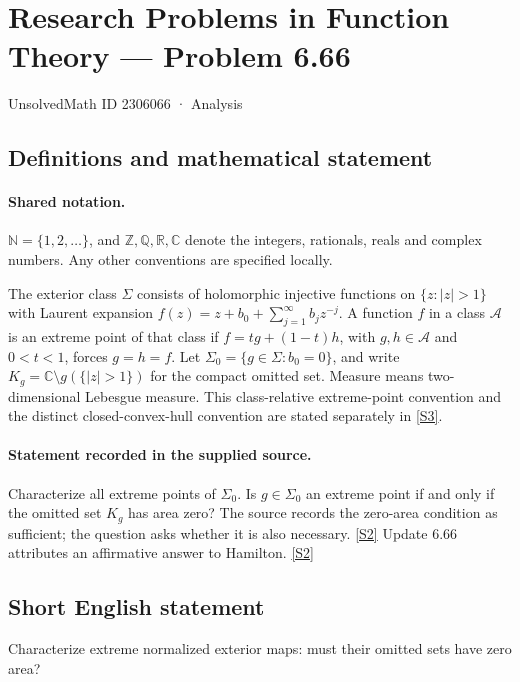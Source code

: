 \documentclass[11pt]{article}
\newcommand{\sref}[2]{\hyperlink{source:#1:#2}{[S#2]}}
\begin{document}
\setcounter{section}{2306065}
\section{Research Problems in Function Theory — Problem 6.66}\label{2306066}
{\small\sffamily UnsolvedMath ID 2306066 · Analysis}
\subsection{Definitions and mathematical statement}

\paragraph{Shared notation.}$\mathbb N=\{1,2,\ldots\}$, and $\mathbb Z,\mathbb Q,\mathbb R,\mathbb C$ denote the integers, rationals, reals and complex numbers. Any other conventions are specified locally.


The exterior class $\Sigma$ consists of holomorphic injective functions on $\{z:|z|>1\}$ with Laurent expansion $f(z)=z+b_0+\sum_{j=1}^{\infty}b_jz^{-j}$. A function $f$ in a class $\mathcal A$ is an extreme point of that class if $f=tg+(1-t)h$, with $g,h\in\mathcal A$ and $0<t<1$, forces $g=h=f$. Let $\Sigma_0=\{g\in\Sigma:b_0=0\}$, and write $K_g=\mathbb C\setminus g(\{|z|>1\})$ for the compact omitted set. Measure means two-dimensional Lebesgue measure. This class-relative extreme-point convention and the distinct closed-convex-hull convention are stated separately in \sref{2306066}{3}.
\paragraph{Statement recorded in the supplied source.}
Characterize all extreme points of $\Sigma_0$. Is $g\in\Sigma_0$ an extreme point if and only if the omitted set $K_g$ has area zero? The source records the zero-area condition as sufficient; the question asks whether it is also necessary. \sref{2306066}{2}
Update 6.66 attributes an affirmative answer to Hamilton. \sref{2306066}{2}
\subsection{Short English statement}
Characterize extreme normalized exterior maps: must their omitted sets have zero area?
\end{document}
